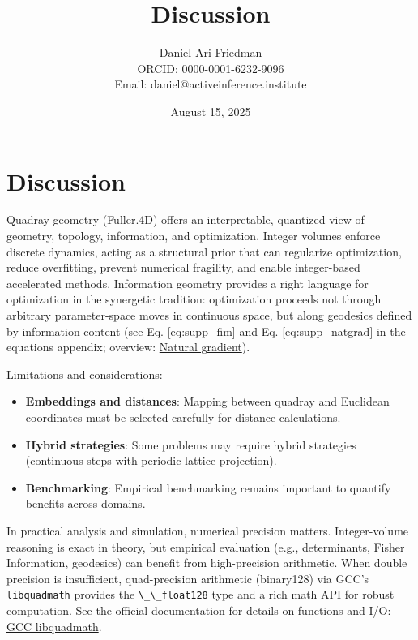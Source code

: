 \documentclass[
  10pt,
]{article}
\title{Discussion}
\author{Daniel Ari Friedman\\ ORCID: 0000-0001-6232-9096\\ Email: daniel@activeinference.institute}
\date{August 15, 2025}
\newcommand{\passthrough}[1]{#1}
\providecommand{\tightlist}{%
  \setlength{\itemsep}{0pt}\setlength{\parskip}{0pt}}
\begin{document}
\maketitle

{
\hypersetup{linkcolor=black}
\setcounter{tocdepth}{3}
\tableofcontents
}
\hypertarget{discussion}{%
\section{Discussion}\label{discussion}}

Quadray geometry (Fuller.4D) offers an interpretable, quantized view of
geometry, topology, information, and optimization. Integer volumes
enforce discrete dynamics, acting as a structural prior that can
regularize optimization, reduce overfitting, prevent numerical
fragility, and enable integer-based accelerated methods. Information
geometry provides a right language for optimization in the synergetic
tradition: optimization proceeds not through arbitrary parameter-space
moves in continuous space, but along geodesics defined by information
content (see Eq. \eqref{eq:supp_fim} and Eq. \eqref{eq:supp_natgrad} in
the equations appendix; overview:
\href{https://en.wikipedia.org/wiki/Natural_gradient}{Natural
gradient}).

Limitations and considerations:

\begin{itemize}
\tightlist
\item
  \textbf{Embeddings and distances}: Mapping between quadray and
  Euclidean coordinates must be selected carefully for distance
  calculations.
\item
  \textbf{Hybrid strategies}: Some problems may require hybrid
  strategies (continuous steps with periodic lattice projection).
\item
  \textbf{Benchmarking}: Empirical benchmarking remains important to
  quantify benefits across domains.
\end{itemize}

In practical analysis and simulation, numerical precision matters.
Integer-volume reasoning is exact in theory, but empirical evaluation
(e.g., determinants, Fisher Information, geodesics) can benefit from
high-precision arithmetic. When double precision is insufficient,
quad-precision arithmetic (binary128) via GCC's
\passthrough{\lstinline!libquadmath!} provides the
\passthrough{\lstinline!\_\_float128!} type and a rich math API for
robust computation. See the official documentation for details on
functions and I/O:
\href{https://gcc.gnu.org/onlinedocs/libquadmath/index.html}{GCC
libquadmath}.
\end{document}
